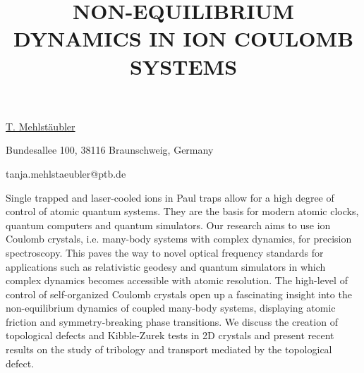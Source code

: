 \title{NON-EQUILIBRIUM DYNAMICS IN ION COULOMB SYSTEMS}

\underline{T. Mehlst\"aubler}  

{\normalsize{\vspace{-4mm}
Bundesallee 100,
38116 Braunschweig,
Germany



\email tanja.mehlstaeubler@ptb.de}}

Single trapped and laser-cooled ions in Paul traps allow for a high degree of control of atomic quantum systems. They are the basis for modern atomic clocks, quantum computers and quantum simulators. Our research aims to use ion Coulomb crystals, i.e. many-body systems with complex dynamics, for precision spectroscopy. This paves the way to novel optical frequency standards for applications such as relativistic geodesy and quantum simulators in which complex dynamics becomes accessible with atomic resolution.
The high-level of control of self-organized Coulomb crystals open up a fascinating insight into the non-equilibrium dynamics of coupled many-body systems, displaying atomic friction and symmetry-breaking phase transitions. We discuss the creation of topological defects and Kibble-Zurek tests in 2D crystals and present recent results on the study of tribology and transport mediated by the topological defect.


\vspace{\baselineskip}
